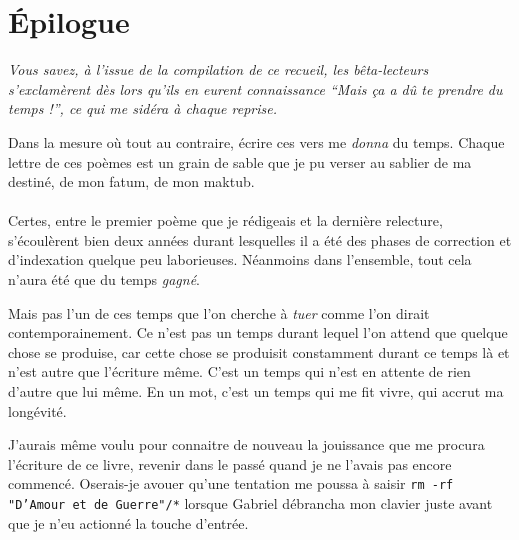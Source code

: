 \section*{Épilogue}
\thispagestyle{empty}
%
%
%
{\em\small
  Vous savez, à l’issue de la compilation de ce recueil, les bêta-lecteurs s’exclamèrent dès lors qu’ils en eurent connaissance \enquote{Mais ça a dû te \emph{prendre} du temps !}, ce qui me sidéra à chaque reprise.

  Dans la mesure où tout au contraire, écrire ces vers me \emph{donna} du temps. Chaque lettre de ces poèmes est un grain de sable que je pu verser au sablier de ma destiné, de mon fatum, de mon maktub.

  \paragraph{}
  Certes, entre le premier poème que je rédigeais et la dernière relecture, s’écoulèrent bien deux années durant lesquelles il a été des phases de correction et d’indexation quelque peu laborieuses. Néanmoins dans l’ensemble, tout cela n’aura été que du temps \emph{gagné}.

  Mais pas l’un de ces temps que l’on cherche à \emph{tuer} comme l’on dirait contemporainement. 
  Ce n’est pas un temps durant lequel l’on attend que quelque chose se produise, car cette chose se produisit constamment durant ce temps là et n’est autre que l’écriture même. C’est un temps qui n’est en attente de rien d’autre que lui même. En un mot, c’est un temps qui me fit vivre, qui accrut ma longévité.

  J’aurais même voulu pour connaitre de nouveau la jouissance que me procura l’écriture de ce livre, revenir dans le passé quand je ne l’avais pas encore commencé.
  Oserais-je avouer qu’une tentation me poussa à saisir \texttt{rm -rf "D’Amour et de Guerre"/*} lorsque Gabriel débrancha mon clavier juste avant que je n’eu actionné la touche d’entrée.

}
